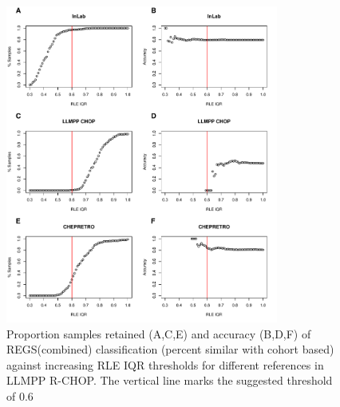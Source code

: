\begin{figure}
	\begin{center}
		\includegraphics[width=0.8\textwidth]{figures/RCHOP_rle_classification_regs.pdf}
	\end{center}
	\caption{Proportion samples retained (A,C,E) and accuracy (B,D,F) of REGS(combined) classification (percent similar with cohort based) against increasing RLE IQR thresholds for different references in LLMPP R-CHOP. The vertical line marks the suggested threshold of 0.6}
	\label{fig:RCHOP_rle_clas_regs}
\end{figure}
